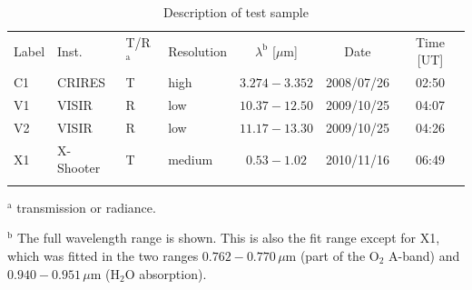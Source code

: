 \begin{table}
\caption[]{Description of test sample}
\label{tab:sample}
\centering
\vspace{5pt}
\begin{tabular}{l l l l c c c}
\hline\hline
\noalign{\smallskip}
Label & Inst. & T/R$^\mathrm{a}$ & Resolution &
$\lambda^\mathrm{b}$ [$\mu$m] & Date & Time [UT] \\
\noalign{\smallskip}
\hline
\noalign{\smallskip}
C1 & CRIRES & T & high & $3.274 - 3.352$ & 2008/07/26 & 02:50 \\
V1 & VISIR & R & low & $10.37 - 12.50$ & 2009/10/25 & 04:07 \\
V2 & VISIR & R & low & $11.17 - 13.30$ & 2009/10/25 & 04:26 \\
X1 & X-Shooter & T & medium & $0.53 - 1.02$ & 2010/11/16 & 06:49 \\
\noalign{\smallskip}
\hline
\end{tabular}
\begin{list}{}{}
\item[$^\mathrm{a}$] transmission or radiance.
\item[$^\mathrm{b}$] The full wavelength range is shown. This is also the fit
range except for X1, which was fitted in the two ranges $0.762 - 0.770$\,$\mu$m
(part of the O$_2$ A-band) and $0.940 - 0.951$\,$\mu$m (H$_2$O absorption).
\end{list}
\end{table}

